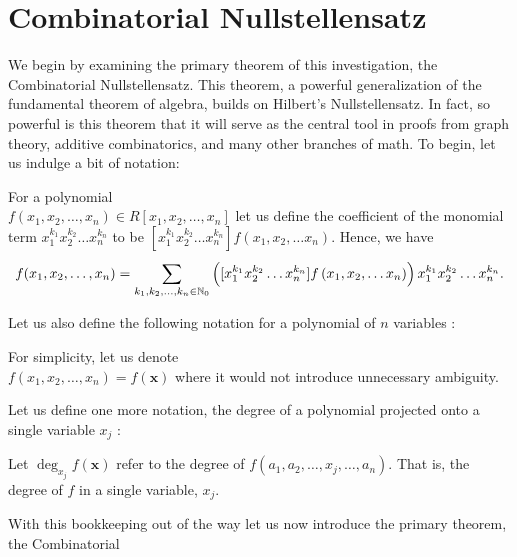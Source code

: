 \chapter{Combinatorial Nullstellensatz} We begin by
examining the primary theorem of this investigation, the Combinatorial
Nullstellensatz. This theorem, a powerful generalization of the fundamental
theorem of algebra, builds on Hilbert's Nullstellensatz. In fact, so powerful
is this theorem that it will serve as the central tool in proofs from graph
theory, additive combinatorics, and many other branches of math. To begin, let
us indulge a bit of notation: \begin{notation} For
	a polynomial\\ $f(x_1, x_2, \ldots, x_{n}) \in R[x_1,x_2, \ldots,
	x_{n}]$ let us define the coefficient of the monomial term
	$x_1^{k_1}x_2^{k_2}\ldots x_{n}^{k_n}$ to be $[x_1^{k_1}x_2^{k_2}\ldots
	x_{n}^{k_n}]f\left( x_1,x_2,\ldots x_{n} \right) $. Hence, we have \[ f(x_1, x_2, \ldots, x_{n}) = \sum_{k_1, k_2, \ldots, k_n \in
			\mathbb{N}_0}^{}\left( [x_1^{k_1}x_2^{k_2}\ldots
		x_{n}^{k_n}]f\left( x_1,x_2,\ldots x_{n} \right)\right)
		x_1^{k_1}x_2^{k_2}\ldots x_{n}^{k_n}   .\]
		\end{notation} Let us also define the following notation for a
		polynomial of $n$ variables : \begin{notation} For simplicity, let us denote\\ $f\left(
		x_1, x_2, \ldots, x_{n} \right) = f\left( \textbf{x} \right) $
	where it would not introduce unnecessary ambiguity.  \end{notation} Let
	us define one more notation, the degree of a polynomial projected onto
	a single variable $x_{j}$ : \begin{notation} Let $\deg_{x_{j}} f \left( \textbf{x} \right)$
		refer to the degree of $f\left( a_1, a_2, \ldots, x_{j},
		\ldots, a_n \right) $. That is, the degree of $f$ in a single variable, $x_{j}$.  \end{notation}
		\newpage With this bookkeeping out of the way let us now
		introduce the primary theorem, the Combinatorial
